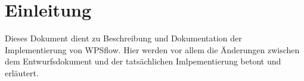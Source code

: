 \chapter{Einleitung}
    Dieses Dokument dient zu Beschreibung und Dokumentation der Implementierung von WPSflow. Hier werden vor allem die Änderungen zwischen dem Entwurfsdokument und der tatsächlichen Imlpementierung betont und erläutert. 